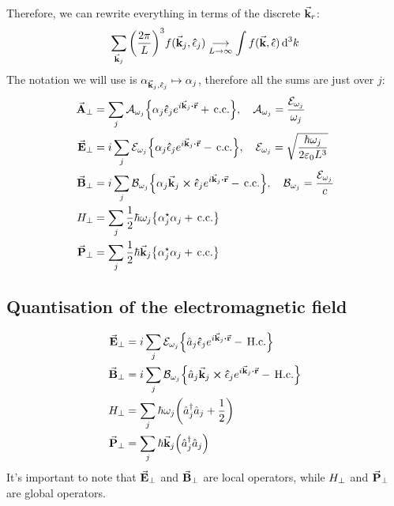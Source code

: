 Therefore, we can rewrite everything in terms of the discrete $\va{k}_{r}$:
\begin{align}\label{eq:disc-cont}
	\sum_{\va{k}_{j}} \qty(\frac{2\pi}{L})^{3} f(\va{k}_{j}, \vu{\epsilon}_{j}) \underset{L \to \infty}{\longrightarrow} \int f(\va{k}, \vu{\epsilon}) \dd[3]{k}
\end{align}
The notation we will use is $\alpha_{\va{k}_{j},\vu{\epsilon}_{j}} \mapsto \alpha_{j}$, therefore all the sums are just over $j$:
\begin{subequations}
\begin{align}
	\trn{\va{A}} &= \sum_{j} \mc{A}_{\omega_{j}} \qty{\alpha_{j} \vu{\epsilon}_{j} e^{i \va{k}_{j} \vdot \va{r}} + \cc} \qc \mc{A}_{\omega_{j}} = \frac{\mc{E}_{\omega_{j}}}{\omega_{j}} \\
	\trn{\va{E}} &= i \sum_{j} \mc{E}_{\omega_{j}} \qty{\alpha_{j} \vu{\epsilon}_{j} e^{i \va{k}_{j} \vdot \va{r}} - \cc} \qc \mc{E}_{\omega_{j}} = \sqrt{\frac{\hbar \omega_{j}}{2 \varepsilon_{0} L^{3}}} \\
	\trn{\va{B}} &= i \sum_{j} \mc{B}_{\omega_{j}} \qty{\alpha_{j} \va{k}_{j} \cross \vu{\epsilon}_{j} e^{i \va{k}_{j} \vdot \va{r}} - \cc} \qc \mc{B}_{\omega_{j}} = \frac{\mc{E}_{\omega_{j}}}{c} \\
	\trn{H} &= \sum_{j} \frac{1}{2} \hbar \omega_{j} \qty{\alpha_{j}\sast \alpha_{j} + \cc} \\
	\trn{\va{P}} &= \sum_{j} \frac{1}{2} \hbar \va{k}_{j} \qty{\alpha_{j}\sast \alpha_{j} + \cc}
\end{align}
\end{subequations}

\subsection{Quantisation of the electromagnetic field}
\begin{subequations}
\begin{align}
	\trn{\va{E}} &= i \sum_{j} \mc{E}_{\omega_{j}} \qty{\hat{a}_{j} \vu{\epsilon}_{j} e^{i \va{k}_{j} \vdot \va{r}} - \Hc} \\
	\trn{\va{B}} &= i \sum_{j} \mc{B}_{\omega_{j}} \qty{\hat{a}_{j} \va{k}_{j} \cross \vu{\epsilon}_{j} e^{i \va{k}_{j} \vdot \va{r}} - \Hc} \\
	\trn{H} &= \sum_{j} \hbar \omega_{j} \qty(\hat{a}_{j}\sdag \hat{a}_{j} + \frac{1}{2} ) \\
	\trn{\va{P}} &= \sum_{j} \hbar \va{k}_{j} \qty(\hat{a}_{j}\sdag \hat{a}_{j})
\end{align}
\end{subequations}
It's important to note that ${\va{E}}_{\perp}$ and ${\va{B}}_{\perp}$ are local operators, while ${H}_{\perp}$ and ${\va{P}}_{\perp}$ are global operators.

